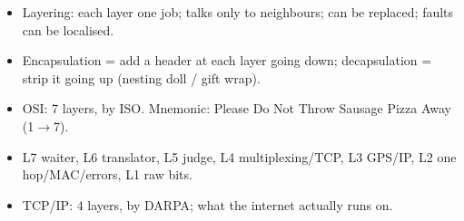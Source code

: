 \begin{recap}
\begin{itemize}
  \item Layering: each layer one job; talks only to neighbours; can be replaced; faults can be localised.
  \item Encapsulation = add a header at each layer going down; decapsulation = strip it going up (nesting doll / gift wrap).
  \item OSI: 7 layers, by ISO. Mnemonic: Please Do Not Throw Sausage Pizza Away (1$\to$7).
  \item L7 waiter, L6 translator, L5 judge, L4 multiplexing/TCP, L3 GPS/IP, L2 one hop/MAC/errors, L1 raw bits.
  \item TCP/IP: 4 layers, by DARPA; what the internet actually runs on.
\end{itemize}
\end{recap}
